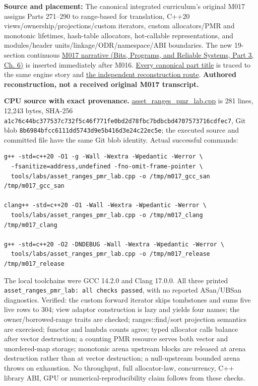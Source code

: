 \hypertarget{appendix-a103e7846d21-phase-7-additive-reconstruction-m017-parts-271290}{}

\textbf{Source and placement:} The canonical integrated curriculum's original M017 assigns Parts 271--290 to range-based for translation, C++20 views/ownership/projections/custom iterators, custom allocators/PMR and monotonic lifetimes, hash-table allocators, hot-callable representations, and modules/header units/linkage/ODR/namespace/ABI boundaries. The new 19-section continuous \href{../01-Bits-Programs-and-Reliable-Systems-P03/main.pdf\#nameddest=01-foundations-i-ch006-from-copying-every-asset-report-to-a-lazy-allocatable-separately-compiled-query-service}{M017 narrative (Bits, Programs, and Reliable Systems, Part 3, Ch. 6)} is inserted immediately after M016. \hyperref[appendix-fd090d982a15-m017-parts-271290-lazy-asset-queries-allocation-lifetimes-and-compiled-api-boundaries]{Every canonical part title} is traced to the same engine story and \hyperref[appendix-960160274237-from-borrowed-reports-to-module-boundaries-m017-reconstruction]{the independent reconstruction route}. \textbf{Authored reconstruction, not a received original M017 transcript.}

\textbf{CPU source with exact provenance.} \hyperref[source-file-a1c76c44bc377537c732f5c4]{asset\_ranges\_pmr\_lab.cpp} is 281 lines, 12,243 bytes, SHA-256 \texttt{a1c76c44bc377537c732f5c46f771fe0bd2d78fbc7bdbcbd4707573716cdfec7}, Git blob \texttt{8b6984bfcc6111dd5743d9e5b416d3e24c22ec5e}; the executed source and committed file have the same Git blob identity. Actual successful commands:

\begin{verbatim}
g++ -std=c++20 -O1 -g -Wall -Wextra -Wpedantic -Werror \
  -fsanitize=address,undefined -fno-omit-frame-pointer \
  tools/labs/asset_ranges_pmr_lab.cpp -o /tmp/m017_gcc_san
/tmp/m017_gcc_san

clang++ -std=c++20 -O1 -Wall -Wextra -Wpedantic -Werror \
  tools/labs/asset_ranges_pmr_lab.cpp -o /tmp/m017_clang
/tmp/m017_clang

g++ -std=c++20 -O2 -DNDEBUG -Wall -Wextra -Wpedantic -Werror \
  tools/labs/asset_ranges_pmr_lab.cpp -o /tmp/m017_release
/tmp/m017_release
\end{verbatim}

The local toolchains were GCC 14.2.0 and Clang 17.0.0. All three printed \texttt{asset\_ranges\_pmr\_lab:\ all\ checks\ passed}, with no reported ASan/UBSan diagnostics. Verified: the custom forward iterator skips tombstones and sums five live rows to 304; view adaptor construction is lazy and yields four names; the owner/borrowed-range traits are checked; ranges::find/sort projection semantics are exercised; functor and lambda counts agree; typed allocator calls balance after vector destruction; a counting PMR resource serves both vector and unordered-map storage; monotonic arena upstream blocks are released at arena destruction rather than at vector destruction; a null-upstream bounded arena throws on exhaustion. No throughput, full allocator-law, concurrency, C++ library ABI, GPU or numerical-reproducibility claim follows from these checks.

